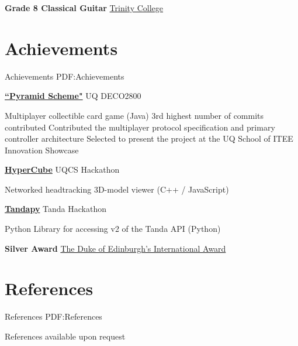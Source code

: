 \documentclass[a4paper,10pt,oneside]{article}
\begin{document}
\begin{body}

\textbf{Grade 8 Classical Guitar}
\href{http://www.trinitycollege.com/}{Trinity College}
\hfill {}






\section
{Achievements}
{Achievements}
{PDF:Achievements}


\href{https://github.com/UQdeco2800/deco2800-2016-pyramidscheme}{\textbf{``Pyramid Scheme"}} UQ DECO2800 \hfill {}
\begin{detail}
	\BulletItem Multiplayer collectible card game (Java)
	\BulletItem 3rd highest number of commits contributed
	\BulletItem Contributed the multiplayer protocol specification and primary controller architecture
	\BulletItem Selected to present the project at the UQ School of ITEE Innovation Showcase
\end{detail}

\href{https://github.com/Chrischar/HyperCube}{\textbf{HyperCube}} UQCS Hackathon \hfill {}
\begin{detail}
Networked headtracking 3D-model viewer (C++ / JavaScript)
\end{detail}

\href{https://github.com/Baralabite/Tandapy}{\textbf{Tandapy}} Tanda Hackathon \hfill {}
\begin{detail}
Python Library for accessing v2 of the Tanda API (Python)
\end{detail}

\textbf{Silver Award}
\href{http://www.dukeofed.com.au/}{The Duke of Edinburgh’s International Award}
\hfill {}



\section
{References}
{References}
{PDF:References}
\par References available upon request




\end{body}
\end{document}

